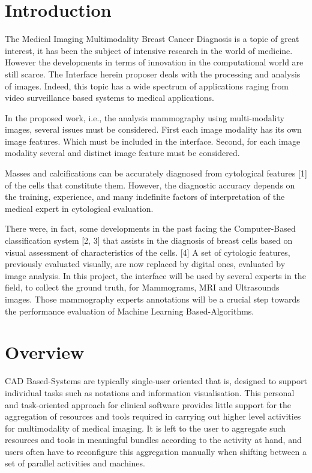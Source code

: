\begin{titlepage}

\vfill %

\end{titlepage}

\section{Introduction}

The Medical Imaging Multimodality Breast Cancer Diagnosis is a topic of great interest, it has been the subject of intensive research in the world of medicine. However the developments in terms of innovation in the computational world are still scarce. The Interface herein proposer deals with the processing and analysis of images. Indeed, this topic has a wide spectrum of applications raging from video surveillance based systems to medical applications.

In the proposed work, i.e., the analysis mammography using multi-modality images, several issues must be considered. First each image modality has its own image features. Which must be included in the interface. Second, for each image modality several and distinct image feature must be considered.

Masses and calcifications can be accurately diagnosed from cytological features [1] of the cells that constitute them. However, the diagnostic accuracy depends on the training, experience, and many indefinite factors of interpretation of the medical expert in cytological evaluation.

There were, in fact, some developments in the past facing the Computer-Based classification system [2, 3] that assists in the diagnosis of breast cells based on visual assessment of characteristics of the cells. [4] A set of cytologic features, previously evaluated visually, are now replaced by digital ones, evaluated by image analysis. In this project, the interface will be used by several experts in the field, to collect the ground truth, for Mammograms, MRI and Ultrasounds images. Those mammography experts annotations will be a crucial step towards the performance evaluation of Machine Learning Based-Algorithms.

\section{Overview}

CAD Based-Systems are typically single-user oriented that is, designed to support individual tasks such as notations and information visualisation. This personal and task-oriented approach for clinical software provides little support for the aggregation of resources and tools required in carrying out higher level activities for multimodality of medical imaging. It is left to the user to aggregate such resources and tools in meaningful bundles according to the activity at hand, and users often have to reconfigure this aggregation manually when shifting between a set of parallel activities and machines.

